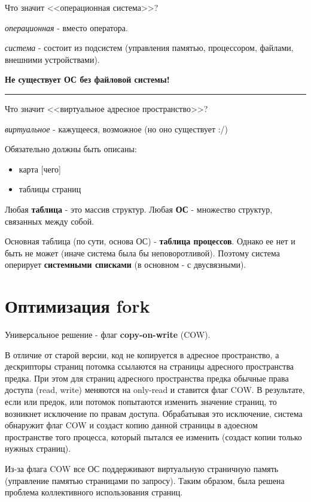 \documentclass[14pt, a4paper]{article}
\begin{document}
	Что значит <<операционная система>>?
	
	{\it операционная} - вместо оператора.
	
	{\it система} - состоит из подсистем (управления памятью, процессором, файлами, внешними устройствами).
	
	{\bf Не существует ОС без файловой системы!}
	
	\noindent\rule{\textwidth}{1pt}
	
	Что значит <<виртуальное адресное пространство>>?
	
	{\it виртуальное} - кажущееся, возможное (но оно существует :\slash)
	
	Обязательно должны быть описаны:
	
	\begin{itemize}
		\item карта [чего]
		
		\item таблицы страниц
	\end{itemize}

	Любая {\bf таблица} - это массив структур. Любая {\bf ОС} - множество структур, связанных между собой.
	
	Основная таблица (по сути, основа ОС) - {\bf таблица процессов}. Однако ее нет и быть не может (иначе система была бы неповоротливой). Поэтому система оперирует {\bf системными списками} (в основном - с двусвязными).
	
	\section*{Оптимизация fork}
	
	Универсальное решение - флаг {\bf copy-on-write} (COW).
	
	В отличие от старой версии, код не копируется в адресное пространство, а дескрипторы страниц потомка ссылаются на страницы адресного пространства предка. При этом для страниц адресного пространства предка обычные права доступа (read, write) меняются на only-read и ставится флаг COW. В результате, если или предок, или потомок попытаются изменить значение страниц, то возникнет исключение по правам доступа. Обрабатывая это исключение, система обнаружит флаг COW и создаст копию данной страницы в адоесном пространстве того процесса, который пытался ее изменить (создаст копии только нужных страниц).
	
	Из-за флага COW все ОС поддерживают виртуальную страничную память (управление памятью страницами по запросу). Таким образом, была решена проблема коллективного использования страниц.
	
\end{document}
